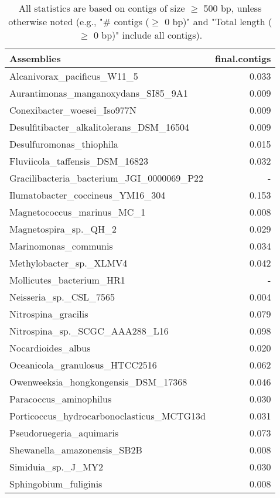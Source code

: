 \documentclass[12pt,a4paper]{article}
\begin{document}
\begin{table}[ht]
\begin{center}
\caption{All statistics are based on contigs of size $\geq$ 500 bp, unless otherwise noted (e.g., "\# contigs ($\geq$ 0 bp)" and "Total length ($\geq$ 0 bp)" include all contigs).}
\begin{tabular}{|l*{1}{|r}|}
\hline
Assemblies & final.contigs \\ \hline
Alcanivorax\_pacificus\_W11\_5 & 0.033 \\ \hline
Aurantimonas\_manganoxydans\_SI85\_9A1 & 0.009 \\ \hline
Conexibacter\_woesei\_Iso977N & 0.009 \\ \hline
Desulfitibacter\_alkalitolerans\_DSM\_16504 & 0.009 \\ \hline
Desulfuromonas\_thiophila & 0.015 \\ \hline
Fluviicola\_taffensis\_DSM\_16823 & 0.032 \\ \hline
Gracilibacteria\_bacterium\_JGI\_0000069\_P22 & - \\ \hline
Ilumatobacter\_coccineus\_YM16\_304 & 0.153 \\ \hline
Magnetococcus\_marinus\_MC\_1 & 0.008 \\ \hline
Magnetospira\_sp.\_QH\_2 & 0.029 \\ \hline
Marinomonas\_communis & 0.034 \\ \hline
Methylobacter\_sp.\_XLMV4 & 0.042 \\ \hline
Mollicutes\_bacterium\_HR1 & - \\ \hline
Neisseria\_sp.\_CSL\_7565 & 0.004 \\ \hline
Nitrospina\_gracilis & 0.079 \\ \hline
Nitrospina\_sp.\_SCGC\_AAA288\_L16 & 0.098 \\ \hline
Nocardioides\_albus & 0.020 \\ \hline
Oceanicola\_granulosus\_HTCC2516 & 0.062 \\ \hline
Owenweeksia\_hongkongensis\_DSM\_17368 & 0.046 \\ \hline
Paracoccus\_aminophilus & 0.030 \\ \hline
Porticoccus\_hydrocarbonoclasticus\_MCTG13d & 0.031 \\ \hline
Pseudoruegeria\_aquimaris & 0.073 \\ \hline
Shewanella\_amazonensis\_SB2B & 0.008 \\ \hline
Simiduia\_sp.\_J\_MY2 & 0.030 \\ \hline
Sphingobium\_fuliginis & 0.008 \\ \hline

\end{tabular}
\end{center}
\end{table}
\end{document}

